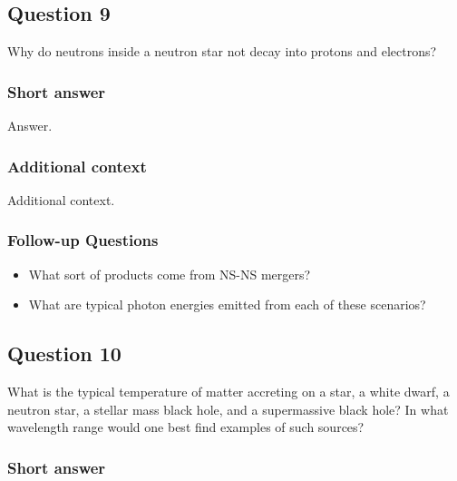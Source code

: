 \documentclass[a4paper,10pt]{article}
\begin{document}

\newpage
\subsection{Question 9}

Why do neutrons inside a neutron star not decay into protons and electrons?

\subsubsection{Short answer}

Answer.

\subsubsection{Additional context}

Additional context.

\subsubsection{Follow-up Questions}

\begin{itemize}
    \item What sort of products come from NS-NS mergers?
    \item What are typical photon energies emitted from each of these scenarios?
\end{itemize}


\newpage
\subsection{Question 10}

What is the typical temperature of matter accreting on a star, a white dwarf, a neutron star, a stellar mass black hole, and a supermassive black hole? In what wavelength range would one best find examples of such sources?

\subsubsection{Short answer}
\end{document}
